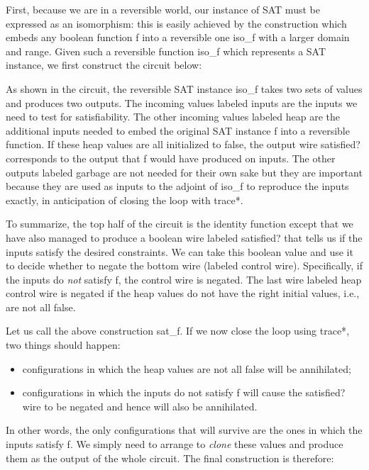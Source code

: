 \documentclass{llncs}
\begin{document}
First, because we are in a reversible world, our instance of SAT must be
expressed as an isomorphism: this is easily achieved by the construction
which embeds any boolean function {{f}} into a reversible one {{iso_f}} with
a larger domain and range.  Given such a reversible function {{iso_f}} which
represents a SAT instance, we first construct the circuit below:

\begin{center}
\end{center}  

As shown in the circuit, the reversible SAT instance {{iso_f}} takes
two sets of values and produces two outputs. The incoming values
labeled \textsf{inputs} are the inputs we need to test for
satisfiability. The other incoming values labeled \textsf{heap} are
the additional inputs needed to embed the original SAT instance {{f}}
into a reversible function. If these \textsf{heap} values are all
initialized to {{false}}, the output wire \textsf{satisfied?}
corresponds to the output that {{f}} would have produced on
\textsf{inputs}. The other outputs labeled \textsf{garbage} are not
needed for their own sake but they are important because they are used
as inputs to the adjoint of {{iso_f}} to reproduce the inputs exactly,
in anticipation of closing the loop with {{trace*}}.

To summarize, the top half of the circuit is the identity function
except that we have also managed to produce a boolean wire labeled
\textsf{satisfied?} that tells us if the inputs satisfy the desired
constraints. We can take this boolean value and use it to decide
whether to negate the bottom wire (labeled \textsf{control
  wire}). Specifically, if the inputs do \emph{not} satisfy {{f}}, the
control wire is negated. The last wire labeled \textsf{heap control
  wire} is negated if the heap values do not have the right initial
values, i.e., are not all {{false}}.

Let us call the above construction {{sat_f}}. If we now close the loop
using {{trace*}}, two things should happen:
\begin{itemize}
\item configurations in which the \textsf{heap} values are not all
  {{false}} will be annihilated;
\item configurations in which the \textsf{inputs} do not satisfy {{f}}
  will cause the \textsf{satisfied?} wire to be negated and hence will
  also be annihilated.
\end{itemize}
In other words, the only configurations that will survive are the ones in
which the \textsf{inputs} satisfy {{f}}. We simply need to arrange to
\emph{clone} these values and produce them as the output of the whole
circuit. The final construction is therefore:
\end{document}
